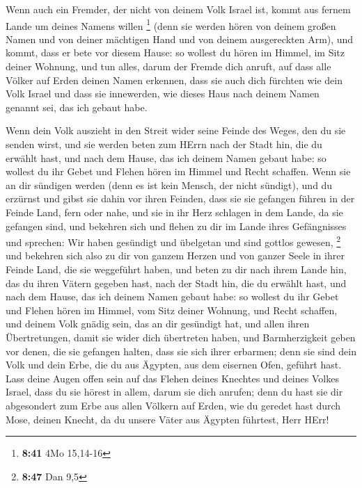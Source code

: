  Wenn auch ein Fremder, der nicht von deinem Volk Israel
ist, kommt aus fernem Lande um deines Namens willen \footnote{\textbf{8:41}
  4Mo 15,14-16}  (denn sie werden hören von deinem großen
Namen und von deiner mächtigen Hand und von deinem ausgereckten Arm),
und kommt, dass er bete vor diesem Hause:  so wollest du
hören im Himmel, im Sitz deiner Wohnung, und tun alles, darum der Fremde
dich anruft, auf dass alle Völker auf Erden deinen Namen erkennen, dass
sie auch dich fürchten wie dein Volk Israel und dass sie innewerden, wie
dieses Haus nach deinem Namen genannt sei, das ich gebaut habe.

 Wenn dein Volk auszieht in den Streit wider seine Feinde
des Weges, den du sie senden wirst, und sie werden beten zum HErrn nach
der Stadt hin, die du erwählt hast, und nach dem Hause, das ich deinem
Namen gebaut habe:  so wollest du ihr Gebet und Flehen
hören im Himmel und Recht schaffen.  Wenn sie an dir
sündigen werden (denn es ist kein Mensch, der nicht sündigt), und du
erzürnst und gibst sie dahin vor ihren Feinden, dass sie sie gefangen
führen in der Feinde Land, fern oder nahe,  und sie in
ihr Herz schlagen in dem Lande, da sie gefangen sind, und bekehren sich
und flehen zu dir im Lande ihres Gefängnisses und sprechen: Wir haben
gesündigt und übelgetan und sind gottlos gewesen, \footnote{\textbf{8:47}
  Dan 9,5}  und bekehren sich also zu dir von ganzem
Herzen und von ganzer Seele in ihrer Feinde Land, die sie weggeführt
haben, und beten zu dir nach ihrem Lande hin, das du ihren Vätern
gegeben hast, nach der Stadt hin, die du erwählt hast, und nach dem
Hause, das ich deinem Namen gebaut habe:  so wollest du
ihr Gebet und Flehen hören im Himmel, vom Sitz deiner Wohnung, und Recht
schaffen,  und deinem Volk gnädig sein, das an dir
gesündigt hat, und allen ihren Übertretungen, damit sie wider dich
übertreten haben, und Barmherzigkeit geben vor denen, die sie gefangen
halten, dass sie sich ihrer erbarmen;  denn sie sind dein
Volk und dein Erbe, die du aus Ägypten, aus dem eisernen Ofen, geführt
hast.  Lass deine Augen offen sein auf das Flehen deines
Knechtes und deines Volkes Israel, dass du sie hörest in allem, darum
sie dich anrufen;  denn du hast sie dir abgesondert zum
Erbe aus allen Völkern auf Erden, wie du geredet hast durch Mose, deinen
Knecht, da du unsere Väter aus Ägypten führtest, Herr HErr!

